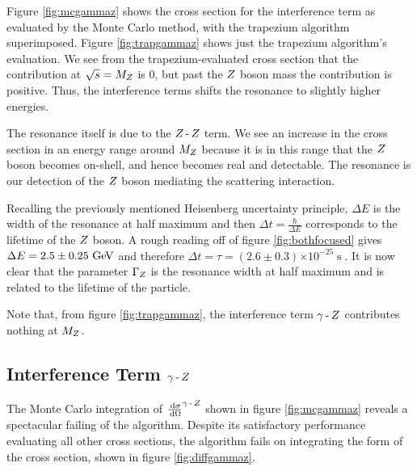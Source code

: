 \documentclass[]{article}
\providecommand{\e}[1]{\ensuremath{\times 10^{#1}}}
\begin{document}
Figure \ref{fig:mcgammaz} shows the cross section for the interference term as evaluated by the Monte Carlo method, with the trapezium algorithm superimposed. Figure \ref{fig:trapgammaz} shows just the trapezium algorithm's evaluation. We see from the trapezium-evaluated cross section that the contribution at $\sqrt{s}=M_{Z }$ is $0$, but past the $Z $ boson mass the contribution is positive. Thus, the interference terms shifts the resonance to slightly higher energies.

The resonance itself is due to the $Z \operatorname{-}Z $ term. We see an increase in the cross section in an energy range around $M_{Z }$ because it is in this range that the $Z $ boson becomes on-shell, and hence becomes real and detectable. The resonance is our detection of the $Z $ boson mediating the scattering interaction.

Recalling the previously mentioned Heisenberg uncertainty principle, $\Delta E$ is the width of the resonance at half maximum and then $\Delta t = \frac{\hbar}{\Delta E}$ corresponds to the lifetime of the $Z $ boson. A rough reading off of figure \ref{fig:bothfocused} gives $\Delta E = 2.5\pm0.25\GeV$ and therefore $\Delta t = \tau = (2.6\pm0.3)\e{-25} \operatorname{s}$. It is now clear that the parameter $\Gamma_{Z }$ is the resonance width at half maximum and is related to the lifetime of the particle.

Note that, from figure \ref{fig:trapgammaz}, the interference term $\gamma\operatorname{-}Z $ contributes nothing at $M_{Z }$.\footnotemark


\subsection{Interference Term $\gamma\operatorname{-}Z $}\label{ssec:interference}

The Monte Carlo integration of $\frac{\,\operatorname{d}\!{\sigma}}{\,\operatorname{d}\!{\Omega}}^{\gamma\operatorname{-}Z }$ shown in figure \ref{fig:mcgammaz} reveals a spectacular failing of the algorithm. Despite its satisfactory performance evaluating all other cross sections, the algorithm fails on integrating the form of the cross section, shown in figure \ref{fig:diffgammaz}.
\end{document}
